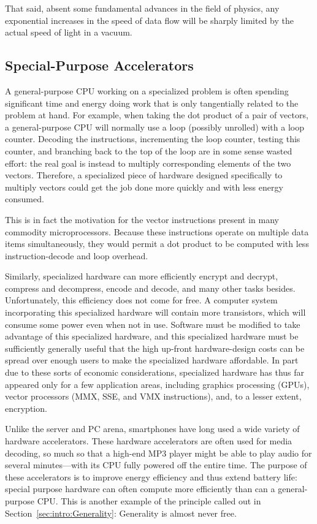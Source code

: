 That said, absent some fundamental advances in the field of physics,
any exponential increases in the speed of data flow
will be sharply limited by the actual speed of light in a vacuum.

\subsection{Special-Purpose Accelerators}
\label{sec:cpu:Special-Purpose Accelerators}

A general-purpose CPU working on a specialized problem is often spending
significant time and energy doing work that is only tangentially related
to the problem at hand.
For example, when taking the dot product of a pair of vectors, a
general-purpose CPU will normally use a loop (possibly unrolled)
with a loop counter.
Decoding the instructions, incrementing the loop counter, testing this
counter, and branching back to the
top of the loop are in some sense wasted effort: the real goal is
instead to multiply corresponding elements of the two vectors.
Therefore, a specialized piece of hardware designed specifically to
multiply vectors could get the job done more quickly and with less
energy consumed.

This is in fact the motivation for the vector instructions present in
many commodity microprocessors.
Because these instructions operate on multiple data items simultaneously,
they would permit a dot product to be computed with less instruction-decode
and loop overhead.

Similarly, specialized hardware can more efficiently encrypt and decrypt,
compress and decompress, encode and decode, and many other tasks besides.
Unfortunately, this efficiency does not come for free.
A computer system incorporating this specialized hardware will contain
more transistors, which will consume some power even when not in use.
Software must be modified to take advantage of this specialized hardware,
and this specialized hardware must be sufficiently generally useful
that the high up-front hardware-design costs can be spread over enough
users to make the specialized hardware affordable.
In part due to these sorts of economic considerations, specialized
hardware has thus far appeared only for a few application areas,
including graphics processing (GPUs), vector processors (MMX, SSE,
and VMX instructions), and, to a lesser extent, encryption.

Unlike the server and PC arena, smartphones have long used a wide
variety of hardware accelerators.
These hardware accelerators are often used for media decoding,
so much so that a high-end MP3 player might be able to play audio
for several minutes---with its CPU fully powered off the entire time.
The purpose of these accelerators is to improve energy efficiency
and thus extend battery life: special purpose hardware can often
compute more efficiently than can a general-purpose CPU.
This is another example of the principle called out in
Section~\ref{sec:intro:Generality}: Generality is almost never free.

